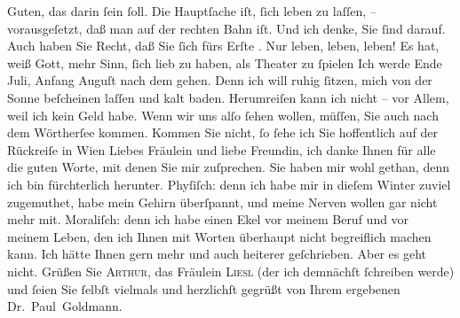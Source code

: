 \begin{ledgroupsized}[t]{13cm}
               Guten, das darin ſein ſoll. Die Hauptſache iſt, ſich leben zu laſſen, –
               vorausgeſetzt, daß man auf der rechten Bahn iſt. Und ich denke, Sie ſind darauf.\pend
           \pstart
           Auch haben Sie Recht, daß Sie ſich fürs Erſte \label{K_L03528-3v}\label{K_L03528-3h}. Nur leben, leben, leben! Es hat, weiß
               Gott, mehr Sinn, ſich lieb zu haben, als Theater zu ſpielen{\dotsfive}\pend
           \pstart
           Ich werde Ende Juli, Anfang Auguſt nach dem \label{K_L03528-4v}\label{K_L03528-4h}{ }{\pb}gehen. Denn ich will ruhig ſitzen, mich von der Sonne beſcheinen laſſen und kalt
               baden. Herumreiſen kann ich nicht – vor Allem, weil ich kein Geld habe. Wenn wir uns
               alſo ſehen wollen, müſſen, Sie auch nach dem Wörtherſee kommen. Kommen Sie nicht, ſo ſehe ich Sie hoffentlich auf der
               Rückreiſe in Wien\pend
           \pstart
           Liebes Fräulein und liebe Freundin, ich danke Ihnen für alle die guten Worte, mit
               denen Sie mir zuſprechen. Sie haben mir wohl gethan, denn ich bin fürchterlich
               herunter. {\pb}Phyſiſch: denn ich habe mir in dieſem
               Winter zuviel zugemuthet, habe mein Gehirn überſpannt, und meine Nerven wollen gar
               nicht mehr mit. Moraliſch: denn ich habe einen Ekel vor meinem Beruf und vor meinem
               Leben, den ich Ihnen mit Worten überhaupt nicht begreiflich machen kann. Ich hätte
               Ihnen gern mehr und auch heiterer geſchrieben. Aber es geht nicht. Grüßen Sie \textsc{Arthur}, das Fräulein \textsc{Liesl} (der ich demnächſt ſchreiben werde) und ſeien Sie ſelbſt vielmals und
               herzlichſt gegrüßt von Ihrem ergebenen {\\}\spacefill\mbox{Dr. Paul Goldmann.}\pend
           
         
         \endnumbering{}\end{ledgroupsized}\begin{anhang}\end{anhang}\newcommand{\dateiname}{L03528}\newcommand{\titel}{Paul Goldmann an Olga Gussmann, 28. 5. [1901]}\newcommand{\editorInnen}{Martin Anton Müller und Laura Untner}
      